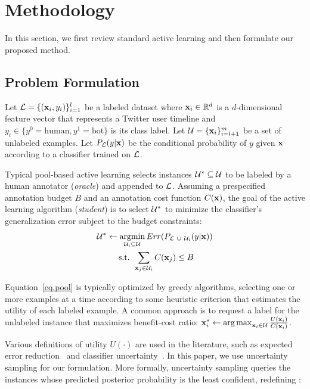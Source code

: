  
\section{Methodology}

In this section, we first review standard active learning and then formulate our proposed method. 

\subsection{Problem Formulation}

Let ${\mathcal{L}} = \{({\mathbf x}_i, y_i)\}_{i=1}^l$ be a labeled dataset where ${\mathbf x}_i \in
\mathbb{R}^d$ is a $d$-dimensional feature vector that represents a Twitter user timeline and $y_i \in \{y^0=\mathrm{human}, y^1=\mathrm{bot}\}$ is its class label. Let ${\mathcal{U}} = \{{\mathbf x}_i\}_{i=l+1}^{m}$ be a set of unlabeled examples. Let $P_{\mathcal{L}}(y|{\mathbf x})$ be the conditional probability of $y$ given ${\mathbf x}$ according to a classifier trained on ${\mathcal{L}}$.

Typical pool-based active learning selects instances ${\mathcal{U}}^* \subseteq {\mathcal{U}}$ to
be labeled by a human annotator ({\it oracle}) and appended to ${\mathcal{L}}$. Assuming
a prespecified annotation budget $B$ and an annotation cost function $C({\mathbf x})$,
the goal of the active learning algorithm ({\it student}) is to select ${\mathcal{U}}^*$
to minimize the classifier's generalization error subject to the budget
constraints:
%
\begin{multline}
\label{eq.pool}
\Un^* \leftarrow \argmin_{\Un_i \subseteq \Un} Err(P_{\La\ \cup\ \Un_i}(y|\x)) \\
\hbox{ s.t. } \sum_{\x_j\in \Un_i} C(\x_j) \le B
\end{multline}

Equation~\ref{eq.pool} is typically optimized by greedy algorithms, selecting
one or more examples at a time according to some heuristic criterion that
estimates the utility of each labeled example. A common approach is to request
a label for the unlabeled instance that maximizes benefit-cost 
ratio: ${\mathbf x}_i^* \leftarrow \operatorname*{arg\,max}_{{\mathbf x}_i \in {\mathcal{U}}} \frac{U({\mathbf x}_i)}{C({\mathbf x}_i)}$.

Various definitions of utility $U(\cdot)$ are used in the literature, such as
expected error reduction~\cite{roy:icml01} and classifier
uncertainty~\cite{lewis:sigir94}.  In this paper, we use uncertainty sampling for our formulation. More formally, uncertainty sampling queries the instances whose predicted posterior probability is the least confident, redefining : 

